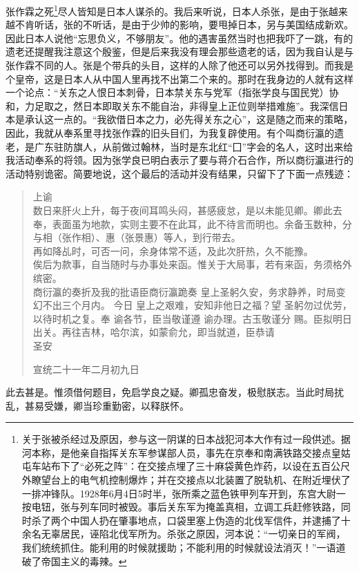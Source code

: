 张作霖之死\footnote{关于张被杀经过及原因，参与这一阴谋的日本战犯河本大作有过一段供述。据河本称，是他亲自指挥关东军参谋部人员，事先在京奉和南满铁路交接点皇姑屯车站布下了“必死之阵”：在交接点埋了三十麻袋黄色炸药，以设在五百公尺外瞭望台上的电气机控制爆炸；并在交接点以北装置了脱轨机、在附近埋伏了一排冲锋队。1928年6月4日5时半，张所乘之蓝色铁甲列车开到，东宫大尉一按电钮，张与列车同时被毁。事后关东军为掩盖真相，立调工兵赶修铁路，同时杀了两个中国人扔在肇事地点，口袋里塞上伪造的北伐军信件，并逮捕了十余名无辜居民，诬陷北伐军所为。杀张之原因，河本说：“一切亲日的军阀，我们统统抓住。能利用的时候就援助；不能利用的时候就设法消灭！”一语道破了帝国主义的毒辣。}尽人皆知是日本人谋杀的。我后来听说，日本人杀张，是由于张越来越不肯听话，张的不听话，是由于少帅的影响，要甩掉日本，另与美国结成新欢。因此日本人说他“忘思负义，不够朋友”。他的遇害虽然当时也把我吓了一跳，有的遗老还提醒我注意这个殷鉴，但是后来我没有理会那些遗老的话，因为我自认是与张作霖不同的人。张是个带兵的头目，这样的人除了他还可以另外找得到。而我是个皇帝，这是日本人从中国人里再找不出第二个来的。那时在我身边的人就有这样一个论点：“关东之人恨日本刺骨，日本禁关东与党军（指张学良与国民党）协和，力足取之，然日本即取关东不能自治，非得皇上正位则举措难施”。我深信日本是承认这一点的。“我欲借日本之力，必先得关东之心”，这是随之而来的策略，因此，我就从奉系里寻找张作霖的旧头目们，为我复辟使用。有个叫商衍瀛的遗老，是广东驻防旗人，从前做过翰林，当时是东北红“囗”字会的名人，这时出来给我活动奉系的将领。因为张学良已明白表示了要与蒋介石合作，所以商衍瀛进行的活动特别诡密。简要地说，这个最后的活动并没有结果，只留下了下面一点残迹：\\

\begin{quote}
	上谕\\

数日来肝火上升，每于夜间耳鸣头闷，甚感疲怠，是以未能见卿。卿此去奉，表面虽为地款，实则主要不在此耳，此不待言而明也。余备玉数种，分与相（张作相）、惠（张景惠）等人，到行带去。\\

再如降乩时，可否一问，余身体常不适，及此次肝热，久不能豫。\\

俟后为款事，自当随时与办事处来函。惟关于大局事，若有来函，务须格外缤密。\\

商衍瀛的奏折及我的批语臣商衍瀛跪奏  皇上圣躬久安，务求静养，时局变幻不出三个月内。  今日  皇上之艰难，安知非他日之福？望  圣躬勿过优劳，以待时机之复。奉  谕各节，臣当敬谨遵  谕办理。古玉敬谨分  赐。臣拟明日出关。再往吉林，哈尔滨，如蒙俞允，即当就道，臣恭请\\

圣安\\

\begin{flushright}
	宣统二十一年二月初九日\\
\end{flushright}
\end{quote}

此去甚是。惟须借何题目，免启学良之疑。卿孤忠奋发，极慰朕志。当此时局扰乱，甚易受嫌，卿当珍重勤密，以释朕怀。\\